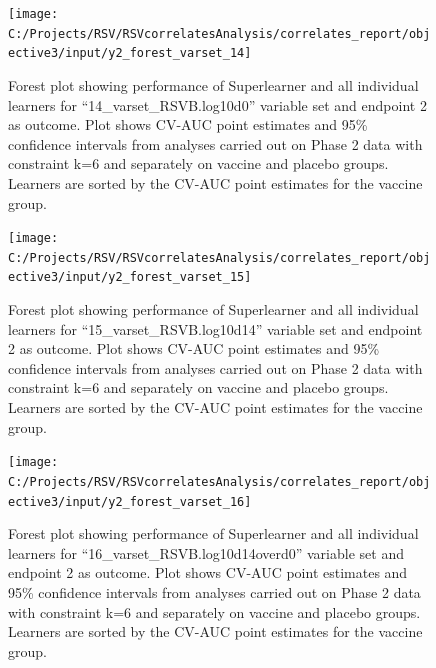 \documentclass[11pt]{article}
\begin{document}
\begin{figure}[H]

{\centering \texttt{[image: C:/Projects/RSV/RSVcorrelatesAnalysis/correlates\_report/objective3/input/y2\_forest\_varset\_14]} 

}

\caption[Forest plot for ``14\_varset\_RSVB.log10d0'' variable set, endpoint 2.]{Forest plot showing performance of Superlearner and all individual learners for ``14\_varset\_RSVB.log10d0'' variable set and endpoint 2 as outcome. Plot shows CV-AUC point estimates and 95\% confidence intervals from analyses carried out on Phase 2 data with constraint k=6 and separately on vaccine and placebo groups. Learners are sorted by the CV-AUC point estimates for the vaccine group.}\label{fig:y2-forest-varset-14}
\end{figure}

\begin{figure}[H]

{\centering \texttt{[image: C:/Projects/RSV/RSVcorrelatesAnalysis/correlates\_report/objective3/input/y2\_forest\_varset\_15]} 

}

\caption[Forest plot for ``15\_varset\_RSVB.log10d14'' variable set, endpoint 2.]{Forest plot showing performance of Superlearner and all individual learners for ``15\_varset\_RSVB.log10d14'' variable set and endpoint 2 as outcome. Plot shows CV-AUC point estimates and 95\% confidence intervals from analyses carried out on Phase 2 data with constraint k=6 and separately on vaccine and placebo groups. Learners are sorted by the CV-AUC point estimates for the vaccine group.}\label{fig:y2-forest-varset-15}
\end{figure}

\begin{figure}[H]

{\centering \texttt{[image: C:/Projects/RSV/RSVcorrelatesAnalysis/correlates\_report/objective3/input/y2\_forest\_varset\_16]} 

}

\caption[Forest plot for ``16\_varset\_RSVB.log10d14overd0'' variable set, endpoint 2.]{Forest plot showing performance of Superlearner and all individual learners for ``16\_varset\_RSVB.log10d14overd0'' variable set and endpoint 2 as outcome. Plot shows CV-AUC point estimates and 95\% confidence intervals from analyses carried out on Phase 2 data with constraint k=6 and separately on vaccine and placebo groups. Learners are sorted by the CV-AUC point estimates for the vaccine group.}\label{fig:y2-forest-varset-16}
\end{figure}
\end{document}
